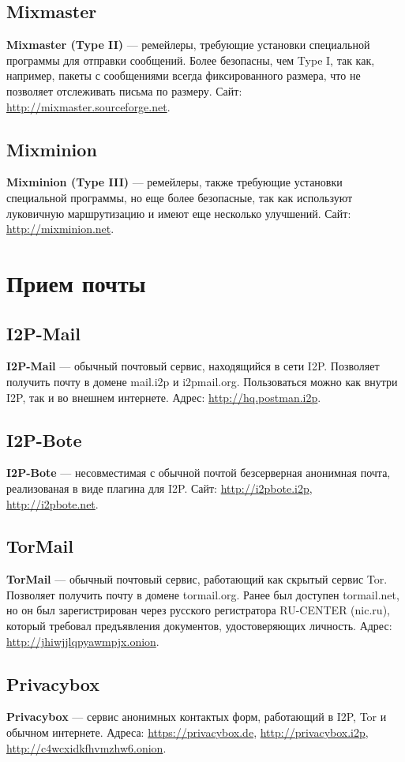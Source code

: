 \begin{enumerate}
\subsection{Mixmaster}
\textbf{Mixmaster (Type II)} --- ремейлеры, требующие установки специальной программы для отправки сообщений. Более безопасны, чем Type I, так как, например, пакеты с сообщениями всегда фиксированного размера, что не позволяет отслеживать письма по размеру. Сайт: \url{http://mixmaster.sourceforge.net}.
\subsection{Mixminion}
\textbf{Mixminion (Type III)} --- ремейлеры, также требующие установки специальной программы, но еще более безопасные, так как используют луковичную маршрутизацию и имеют еще несколько улучшений. Сайт: \url{http://mixminion.net}.

\section{Прием почты}
\subsection{I2P-Mail}
\textbf{I2P-Mail} --- обычный почтовый сервис, находящийся в сети I2P. Позволяет получить почту в домене mail.i2p и i2pmail.org. Пользоваться можно как внутри I2P, так и во внешнем интернете. Адрес: \url{http://hq.postman.i2p}.
\subsection{I2P-Bote}
\textbf{I2P-Bote} --- несовместимая с обычной почтой безсерверная анонимная почта, реализованая в виде плагина для I2P. Сайт: \url{http://i2pbote.i2p}, \url{http://i2pbote.net}.
\subsection{TorMail}
\textbf{TorMail} --- обычный почтовый сервис, работающий как скрытый сервис Tor. Позволяет получить почту в домене tormail.org. Ранее был доступен tormail.net, но он был зарегистрирован через русского регистратора RU-CENTER (nic.ru), который требовал предъявления документов, удостоверяющих личность\cite{tormail}. Адрес: \url{http://jhiwjjlqpyawmpjx.onion}.
\subsection{Privacybox}
\textbf{Privacybox} --- сервис анонимных контактых форм, работающий в I2P, Tor и обычном интернете. Адреса: \url{https://privacybox.de}, \url{http://privacybox.i2p}, \url{http://c4wcxidkfhvmzhw6.onion}.

\end{enumerate}
